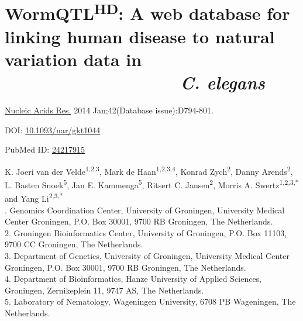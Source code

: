 \chapter[A web database for linking human disease to \textsl{C. elegans}]{WormQTL\textsuperscript{HD}: A web database for linking human disease to natural variation data in ~~~~~~~~~~~~~~~~~~ \textsl{C. elegans}}
\label{chap:wormqtl}

{ \Large {} }

\hfill \underline{Nucleic Acids Res.} 2014 Jan;42(Database issue):D794-801.

\hfill DOI: \href{https://doi.org/10.1093/nar/gkt1044}{10.1093/nar/gkt1044}

\hfill PubMed ID: \href{https://www.ncbi.nlm.nih.gov/pubmed/24217915}{24217915}

\newpage

\noindent
K. Joeri van der Velde\textsuperscript{1,2,3}, Mark de Haan\textsuperscript{1,2,3,4}, Konrad Zych\textsuperscript{2}, Danny Arends\textsuperscript{2},
L. Basten Snoek\textsuperscript{5}, Jan E. Kammenga\textsuperscript{5}, Ritsert C. Jansen\textsuperscript{2}, Morris A. Swertz\textsuperscript{1,2,3,*} and Yang Li\textsuperscript{2,3,*}\\

. Genomics Coordination Center, University of Groningen, University Medical Center Groningen, P.O. Box 30001, 9700 RB Groningen, The Netherlands.\\
2. Groningen Bioinformatics Center, University of Groningen, P.O. Box 11103, 9700 CC Groningen, The Netherlands.\\
3. Department of Genetics, University of Groningen, University Medical Center Groningen, P.O. Box 30001, 9700 RB Groningen, The Netherlands.\\
4. Department of Bioinformatics, Hanze University of Applied Sciences, Groningen, Zernikeplein 11, 9747 AS, The Netherlands.\\
5. Laboratory of Nematology, Wageningen University, 6708 PB Wageningen, The Netherlands.\\

